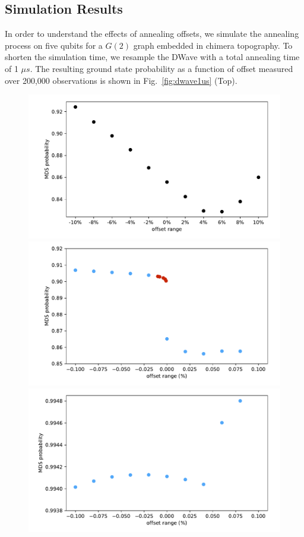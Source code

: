 \documentclass[prd,twocolumn,tightenlines,preprintnumbers,showpacs,superscriptaddress,notitlepage,nofootinbib,eqsecnum,floatfix,longbibliography]{revtex4}
\begin{document}
\subsection{Simulation Results}

In order to understand the effects of annealing offsets, we simulate the annealing process on five qubits for a $G(2)$ graph embedded in chimera topography.
To shorten the simulation time, we resample the DWave with a total annealing time of 1 $\mu s$.
The resulting ground state probability as a function of offset measured over 200,000 observations is shown in Fig.~\ref{fig:dwave1us} (Top).

\begin{figure}
    \centering
    \includegraphics[width=\columnwidth]{./figures/dwave1us.pdf}
    \includegraphics[width=\columnwidth]{./figures/sim_deco.pdf}
    \includegraphics[width=\columnwidth]{./figures/sim_nodeco.pdf}

\end{figure}
\end{document}
